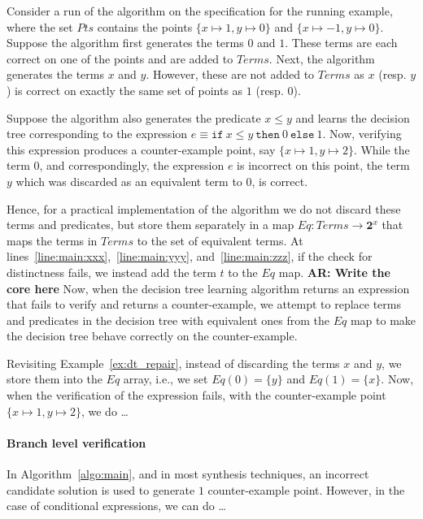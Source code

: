 \documentclass{llncs}
\newcommand\arsays[1]{{\bf AR: #1}}
\newcommand\Equiv{\mathit{Eq}}
\newcommand\Points{\mathit{Pts}}
\newcommand\Expr{e}
\newcommand\Terms{\mathit{Terms}}
\newcommand\Term{t}
\newcommand\Powerset[1]{\mathbf{2}^{#1}}
\begin{document}
\begin{example}
  Consider a run of the algorithm on the specification for the running
  example, where the set $\Points$ contains the points $\{ x \mapsto 1,
  y \mapsto 0 \}$ and $\{ x \mapsto -1, y \mapsto 0 \}$.
  Suppose the algorithm first generates the terms $0$ and $1$.
  These terms are each correct on one of the points and are added to
  $\Terms$.
  Next, the algorithm generates the terms $x$ and $y$.
  However, these are not added to $\Terms$ as $x$ (resp. $y$) is correct
  on exactly the same set of points as $1$ (resp. $0$).

  Suppose the algorithm also generates the predicate $x \leq y$ and
  learns the decision tree corresponding to the expression $\Expr \equiv
  \mathtt{if}~x \leq y~\mathtt{then}~0~\mathtt{else}~1$.
  Now, verifying this expression produces a counter-example point, say
  $\{ x \mapsto 1, y \mapsto 2 \}$.
  While the term $0$, and correspondingly, the expression $\Expr$ is
  incorrect on this point, the term $y$ which was discarded as an
  equivalent term to $0$, is correct.
\end{example}

Hence, for a practical implementation of the algorithm we do not discard
these terms and predicates, but store them separately in a map $\Equiv :
\Terms \to \Powerset{x}$ that maps the terms in $\Terms$ to the set of
equivalent terms.
At lines~\ref{line:main:xxx},~\ref{line:main:yyy},
and~\ref{line:main:zzz}, if the check for distinctness fails, we
instead add the term $\Term$ to the $\Equiv$ map.
\arsays{Write the core here}
Now, when the decision tree learning algorithm returns an expression
that fails to verify and returns a counter-example, we attempt to
replace terms and predicates in the decision tree with equivalent ones
from the $\Equiv$ map to make the decision tree behave correctly on the
counter-example.

\begin{example}
  Revisiting Example~\ref{ex:dt_repair}, instead of discarding the terms
  $x$ and $y$, we store them into the $\Equiv$ array, i.e., we set
  $\Equiv(0) = \{ y \}$ and $\Equiv(1) = \{ x \}$.
  Now, when the verification of the expression fails, with the
  counter-example point $\{ x \mapsto 1, y \mapsto 2 \}$, we do \dots
\end{example}

\paragraph{Branch level verification}
In Algorithm~\ref{algo:main}, and in most synthesis techniques, an
incorrect candidate solution is used to generate $1$ counter-example
point.
However, in the case of conditional expressions, we can do \dots
\end{document}
